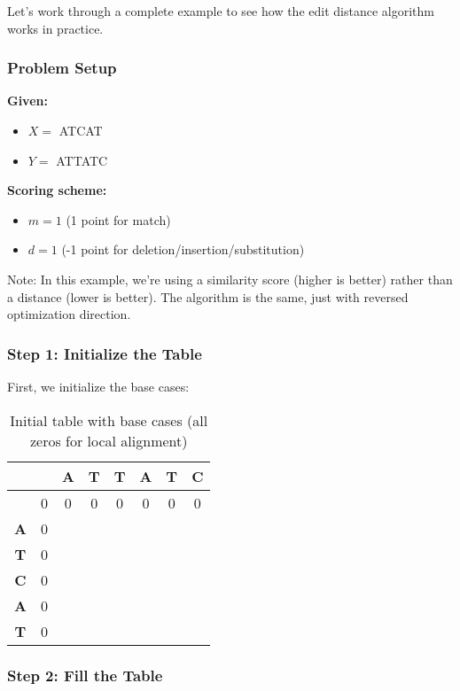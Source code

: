 \documentclass[11pt,a4paper]{article}
\theoremstyle{definition}
\theoremstyle{plain}
\theoremstyle{remark}
\begin{document}
Let's work through a complete example to see how the edit distance algorithm works in practice.

\subsubsection{Problem Setup}

\textbf{Given:}
\begin{itemize}
    \item $X = $ ATCAT
    \item $Y = $ ATTATC
\end{itemize}

\textbf{Scoring scheme:}
\begin{itemize}
    \item $m = 1$ (1 point for match)
    \item $d = 1$ (-1 point for deletion/insertion/substitution)
\end{itemize}

Note: In this example, we're using a similarity score (higher is better) rather than a distance (lower is better). The algorithm is the same, just with reversed optimization direction.

\subsubsection{Step 1: Initialize the Table}

First, we initialize the base cases:

\begin{table}[h]
\centering
\begin{tabular}{|c|c|c|c|c|c|c|c|}
\hline
 & & \textbf{A} & \textbf{T} & \textbf{T} & \textbf{A} & \textbf{T} & \textbf{C} \\
\hline
 & 0 & 0 & 0 & 0 & 0 & 0 & 0 \\
\hline
\textbf{A} & 0 & & & & & & \\
\hline
\textbf{T} & 0 & & & & & & \\
\hline
\textbf{C} & 0 & & & & & & \\
\hline
\textbf{A} & 0 & & & & & & \\
\hline
\textbf{T} & 0 & & & & & & \\
\hline
\end{tabular}
\caption{Initial table with base cases (all zeros for local alignment)}
\end{table}

\subsubsection{Step 2: Fill the Table}
\end{document}
